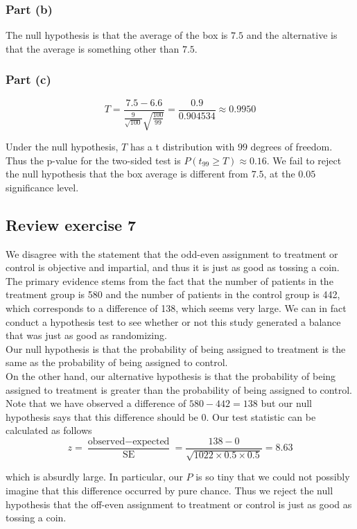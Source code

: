 \documentclass[11pt]{article}
\begin{document}
\subsubsection*{Part (b)}
The null hypothesis is that the average of the box is $7.5$ and the alternative is that the average is something other than $7.5$.
\subsubsection*{Part (c)}
$$T= \frac{7.5 - 6.6}{\frac{9}{\sqrt{100}}\sqrt{\frac{100}{99}}} = \frac{0.9}{0.904534} \approx 0.9950$$

Under the null hypothesis, $T$ has a t distribution with $99$ degrees of freedom.  Thus the p-value for the two-sided test is $ P(t_{99} \geq T) \approx 0.16$.  We fail to reject the null hypothesis that the box average is different from $7.5$, at the $0.05$ significance level.



\subsection*{Review exercise 7} %
We disagree with the statement that the odd-even assignment to treatment or control is objective and impartial, and thus it is just as good as tossing a coin. The primary evidence stems from the fact that the number of patients  in the treatment group is 580 and the number of patients in the control group is 442, which corresponds to a difference of 138, which seems very large. We can in fact conduct a hypothesis test to see whether or not this study generated a balance that was just as good as randomizing.\\

\noindent Our null hypothesis is that the probability of being assigned to treatment is the same as the probability of being assigned to control. \\

\noindent On the other hand, our alternative hypothesis is that the probability of being assigned to treatment is greater than the probability of being assigned to control. Note that we have observed a difference of $580 - 442 = 138$ but our null hypothesis says that this difference should be 0. Our test statistic can be calculated as follows
$$z = \frac{\text{observed} - \text{expected}}{\text{SE}} = \frac{138 - 0}{\sqrt{1022 \times 0.5 \times 0.5}} = 8.63 $$

\noindent which is absurdly large. In particular, our $P$ is so tiny that we could not possibly imagine that this difference occurred by pure chance. Thus we reject the null hypothesis that the off-even assignment to treatment or control is just as good as tossing a coin.
\end{document}
